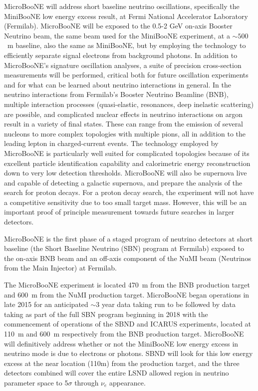 MicroBooNE will address short baseline neutrino oscillations, specifically the MiniBooNE low energy excess result, at Fermi National Accelerator Laboratory (Fermilab).  MicroBooNE will be exposed to the  0.5-2 GeV on-axis Booster Neutrino beam, the same beam used for the MiniBooNE experiment, at a $\sim 500$~m baseline, also the same as MiniBooNE, but by employing the \lartpc technology to efficiently separate signal electrons from background photons.  In addition to MicroBooNE's signature oscillation analyses, a suite of precision cross-section measurements will be performed, critical both for future \lartpc oscillation experiments and for what can be learned about neutrino interactions in general.   In the neutrino interactions from Fermilab's Booster Neutrino Beamline (BNB), multiple interaction processes (quasi-elastic, resonances, deep inelastic scattering) are possible, and complicated nuclear effects in neutrino interactions on argon result in a variety of final states. These can range from the emission of several nucleons to more complex topologies with multiple pions, all in addition to the leading lepton in charged-current events. The \lartpc technology employed by MicroBooNE is particularly well suited for complicated topologies because of its excellent particle identification capability and calorimetric energy reconstruction down to very low detection thresholds. MicroBooNE will also be supernova live and capable of detecting a galactic supernova, and prepare the analysis of  the search for proton decays. For a proton decay search, the experiment will not have a competitive sensitivity due to too small target mass. However, this will be an important proof of principle measurement towards future searches in larger detectors.  

MicroBooNE is the first phase of a staged program of neutrino detectors at short baseline (the Short Baseline Neutrino (SBN) program at Fermilab) exposed to the on-axis BNB beam and an off-axis component of the NuMI beam (Neutrinos from the Main Injector) at Fermilab.  

The MicroBooNE experiment is located 470~m from the BNB production target and 600~m from the NuMI production target.  MicroBooNE began operations in late 2015 for an anticipated $\sim$3 year data taking run to be followed by data taking as part of the full SBN program beginning in 2018 with the commencement of operations of the SBND \cite{Adams:2013-lar1nd} and ICARUS experiments, located at 110~m and 600~m respectively from the BNB production target.  MicroBooNE will definitively address whether or not the MiniBooNE low energy excess in neutrino mode is due to electrons or photons.  SBND will look for this low energy excess at the near location (110m) from the production target, and the three detectors combined will cover the entire LSND allowed region in neutrino parameter space to 5$\sigma$ through $\nu_e$ appearance.

